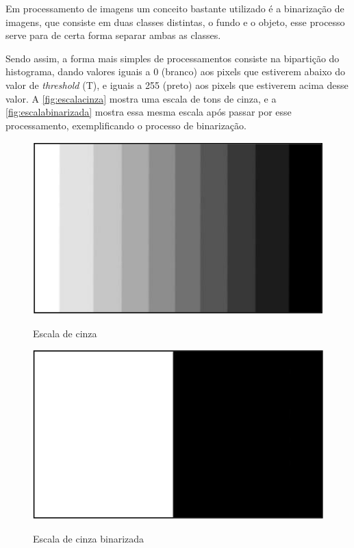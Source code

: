 Em processamento de imagens um conceito bastante utilizado é a binarização de
imagens, que consiste em duas classes distintas, o fundo e o objeto, esse processo 
serve para de certa forma separar ambas as classes.

Sendo assim, a forma mais simples de processamentos consiste na
bipartição do histograma, dando valores iguais a 0 (branco) aos pixels que estiverem
abaixo do valor de \textit{threshold} (T), e iguais a 255 (preto) aos pixels que estiverem 
acima desse valor. A \autoref{fig:escalacinza} mostra uma escala de tons 
de cinza, e a \autoref{fig:escalabinarizada} mostra essa mesma escala após passar 
por esse processamento, exemplificando o processo de binarização.

\begin{figure}[h!]
    \centering
    \caption{Escala de cinza}
    \includegraphics[scale=0.25]{figuras/escala_cinza.png} 
    \fonte{}%
    \label{fig:escalacinza}
    \centering
\end{figure}

\begin{figure}[h!]
    \centering
    \caption{Escala de cinza binarizada}
    \includegraphics[scale=0.25]{figuras/escala_binarizada.png} 
    \fonte{}%
    \label{fig:escalabinarizada}
    \centering
\end{figure}

